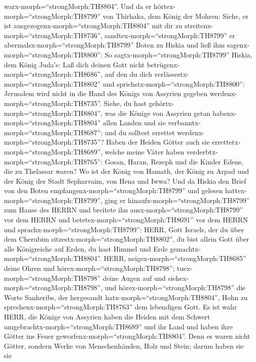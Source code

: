 warx-morph=``strongMorph:TH8804''.  Und da er
hörtex-morph=``strongMorph:TH8799'' von Thirhaka, dem König der Mohren:
Siehe, er ist ausgezogenx-morph=``strongMorph:TH8804'' mit dir zu
streitenx-morph=``strongMorph:TH8736'',
sandtex-morph=``strongMorph:TH8799'' er
abermalsx-morph=``strongMorph:TH8799'' Boten zu Hiskia und ließ ihm
sagenx-morph=``strongMorph:TH8800'':  So
sagtx-morph=``strongMorph:TH8799'' Hiskia, dem König Juda's: Laß dich
deinen Gott nicht betrügenx-morph=``strongMorph:TH8686'', auf den du
dich verlässestx-morph=``strongMorph:TH8802'' und
sprichstx-morph=``strongMorph:TH8800'': Jerusalem wird nicht in die Hand
des Königs von Assyrien gegeben werdenx-morph=``strongMorph:TH8735''.
 Siehe, du hast gehörtx-morph=``strongMorph:TH8804'', was
die Könige von Assyrien getan habenx-morph=``strongMorph:TH8804'' allen
Landen und sie verbanntx-morph=``strongMorph:TH8687''; und du solltest
errettet werdenx-morph=``strongMorph:TH8735''?  Haben der
Heiden Götter auch sie errettetx-morph=``strongMorph:TH8689'', welche
meine Väter haben verderbtx-morph=``strongMorph:TH8765'': Gosan, Haran,
Rezeph und die Kinder Edens, die zu Thelassar waren?  Wo
ist der König von Hamath, der König zu Arpad und der König der Stadt
Sepharvaim, von Hena und Iwwa?  Und da Hiskia den Brief von
den Boten empfangenx-morph=``strongMorph:TH8799'' und gelesen
hattex-morph=``strongMorph:TH8799'', ging er
hinaufx-morph=``strongMorph:TH8799'' zum Hause des HERRN und breitete
ihn ausx-morph=``strongMorph:TH8799'' vor dem HERRN  und
betetex-morph=``strongMorph:TH8691'' vor dem HERRN und
sprachx-morph=``strongMorph:TH8799'': HERR, Gott Israels, der du über
dem Cherubim sitzestx-morph=``strongMorph:TH8802'', du bist allein Gott
über alle Königreiche auf Erden, du hast Himmel und Erde
gemachtx-morph=``strongMorph:TH8804''.  HERR,
neigex-morph=``strongMorph:TH8685'' deine Ohren und
hörex-morph=``strongMorph:TH8798''; tuex-morph=``strongMorph:TH8798''
deine Augen auf und siehex-morph=``strongMorph:TH8798'', und
hörex-morph=``strongMorph:TH8798'' die Worte Sanheribs, der hergesandt
hatx-morph=``strongMorph:TH8804'', Hohn zu
sprechenx-morph=``strongMorph:TH8763'' dem lebendigen Gott.
 Es ist wahr HERR, die Könige von Assyrien haben die Heiden
mit dem Schwert umgebrachtx-morph=``strongMorph:TH8689'' und ihr Land
 und haben ihre Götter ins Feuer
geworfenx-morph=``strongMorph:TH8804''. Denn es waren nicht Götter,
sondern Werke von Menschenhänden, Holz und Stein; darum haben sie sie
